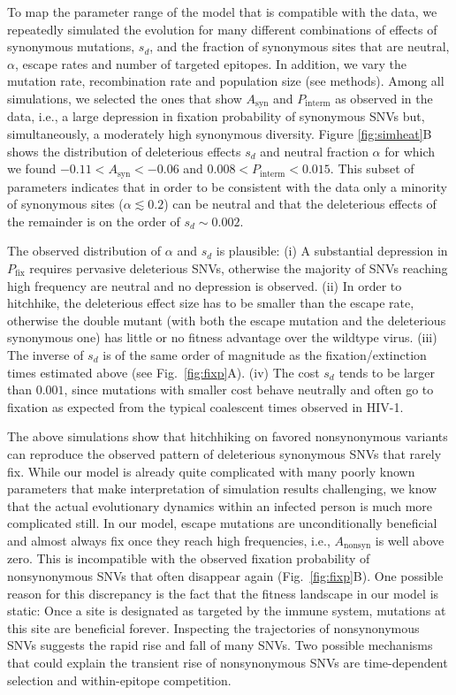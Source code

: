 \documentclass[11pt]{article}
\newcommand{\pfix}{P_{\mathrm{fix}}}
\newcommand{\FIG}[1]{Fig.~\ref{fig:#1}}
\begin{document}
To map the parameter range of the model that is compatible with the data, we
repeatedly simulated the evolution for many different combinations of
effects of synonymous mutations, $s_d$, and the fraction of synonymous
sites that are neutral, $\alpha$, escape rates and number of targeted epitopes. In
addition, we vary the mutation rate, recombination rate and population
size (see methods).  Among all simulations, we selected the ones
that show $A_\mathrm{syn}$ and $P_\mathrm{interm}$ as observed in the data, i.e., a
large depression in fixation probability of synonymous SNVs but, simultaneously,
a moderately high synonymous diversity. Figure \ref{fig:simheat}B shows
the distribution of deleterious effects $s_d$ and neutral fraction
$\alpha$ for which we found $-0.11 < A_\mathrm{syn} < -0.06$ and $0.008 <
P_\mathrm{interm} < 0.015$. This subset of parameters indicates that in
order to be consistent with the data only
a minority of synonymous sites ($\alpha \lesssim 0.2$) can be neutral  and that
the deleterious effects of the remainder is on the order of $s_d \sim
0.002$. 

The observed distribution of $\alpha$ and $s_d$ is plausible:
(i) A substantial depression in $\pfix$ requires pervasive deleterious SNVs, otherwise
the majority of SNVs reaching high frequency are neutral and no depression is
observed. (ii) In order to hitchhike, the deleterious effect size has to be 
smaller than the escape rate, otherwise the double mutant (with both the escape
mutation and the deleterious synonymous one) has little or no fitness advantage
over the wildtype virus. (iii) The inverse of $s_d$ is of the same order of magnitude as the
fixation/extinction times estimated above (see \FIG{fixp}A). (iv)
The cost $s_d$ tends to be larger than $0.001$, since mutations with smaller
cost behave neutrally and often go to fixation
as expected from the typical coalescent times observed in HIV-1.


The above simulations show that hitchhiking on favored nonsynonymous
variants can reproduce the observed pattern of deleterious synonymous SNVs that
rarely fix. While our model is already quite complicated with many
poorly known parameters that make interpretation of simulation results
challenging, we know that the actual evolutionary dynamics within an
infected person is much more complicated still. In our model, 
 escape mutations are unconditionally beneficial and almost
always fix once they reach high frequencies, i.e., $A_{\mathrm{nonsyn}}$ is well
above zero. This is incompatible with the observed fixation probability of
nonsynonymous SNVs that often disappear again
(\FIG{fixp}B). One possible reason for this discrepancy is the fact that
the fitness landscape in our model is static: Once a site is designated
as targeted by the immune system, mutations at this site are beneficial
forever. Inspecting the trajectories of
nonsynonymous SNVs suggests the rapid rise and fall of many SNVs. Two
possible mechanisms that could explain the transient rise of
nonsynonymous SNVs are time-dependent selection and within-epitope competition.
\end{document}
